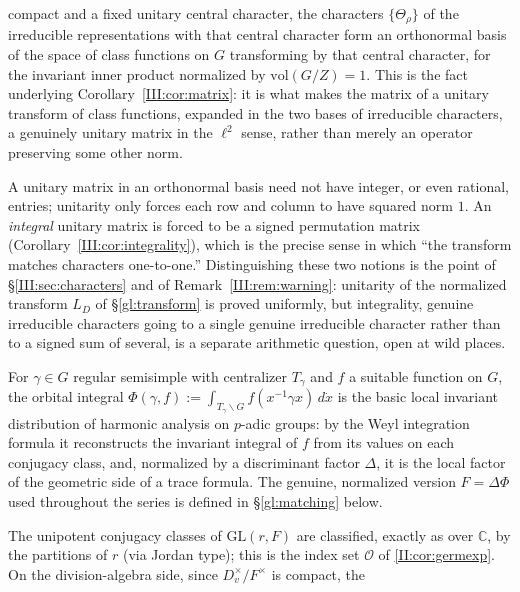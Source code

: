 \begin{description}
compact and a fixed unitary central character, the characters
$\{\Theta_\rho\}$ of the irreducible representations with that
central character form an orthonormal basis of the space of class
functions on $G$ transforming by that central character, for the
invariant inner product normalized by $\mathrm{vol}(G/Z)=1$. This is
the fact underlying Corollary~\ref{III:cor:matrix}: it is what makes
the matrix of a unitary transform of class functions, expanded in
the two bases of irreducible characters, a genuinely unitary matrix
in the $\ell^2$ sense, rather than merely an operator preserving some
other norm.
\item[Unitary versus integral] A unitary matrix in an orthonormal
basis need not have integer, or even rational, entries; unitarity
only forces each row and column to have squared norm $1$. An
\emph{integral} unitary matrix is forced to be a signed permutation
matrix (Corollary~\ref{III:cor:integrality}), which is the precise
sense in which ``the transform matches characters one-to-one.''
Distinguishing these two notions is the point of
\S\ref{III:sec:characters} and of Remark~\ref{III:rem:warning}:
unitarity of the normalized transform $L_D$ of \S\ref{gl:transform}
is proved uniformly, but integrality, genuine irreducible characters
going to a single genuine irreducible character rather than to a
signed sum of several, is a separate arithmetic question, open at
wild places.
\item[Orbital integral] For $\gamma\in G$ regular semisimple with
centralizer $T_\gamma$ and $f$ a suitable function on $G$, the
orbital integral $\Phi(\gamma,f):=\int_{T_\gamma\backslash
G}f(x^{-1}\gamma x)\,d\dot x$ is the basic local invariant
distribution of harmonic analysis on $p$-adic groups: by the Weyl
integration formula it reconstructs the invariant integral of $f$
from its values on each conjugacy class, and, normalized by a
discriminant factor $\Delta$, it is the local factor of the
geometric side of a trace formula. The genuine, normalized version
$F=\Delta\Phi$ used throughout the series is defined in
\S\ref{gl:matching} below.
\item[Unipotent classes of $\mathrm{GL}(r,F)$] The unipotent
conjugacy classes of $\mathrm{GL}(r,F)$ are classified, exactly as
over $\mathbb C$, by the partitions of $r$ (via Jordan type); this is
the index set $\mathcal O$ of \cref{II:cor:germexp}. On the
division-algebra side, since $D_v^\times/F^\times$ is compact, the

\end{description}

